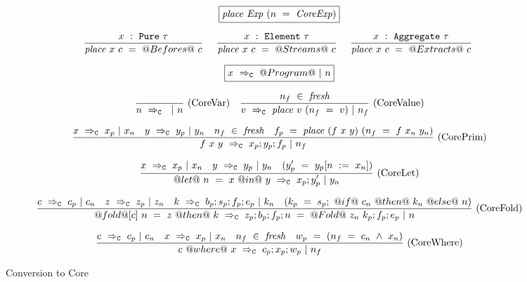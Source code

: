 
\begin{figure*}

$$
\boxed{\mathit{place}~\mathit{Exp}~(n~=~\mathit{CoreExp})}
$$

$$
\frac {\displaystyle 
    x~:~\mathtt{Pure}~\tau
} {\displaystyle 
\mathit{place}~x~c~=~@Befores@~c
} \ 
\quad
\frac {\displaystyle 
    x~:~\mathtt{Element}~\tau
} {\displaystyle 
\mathit{place}~x~c~=~@Streams@~c
} \ 
\quad
\frac {\displaystyle 
    x~:~\mathtt{Aggregate}~\tau
} {\displaystyle 
\mathit{place}~x~c~=~@Extracts@~c
} \ 
$$


$$
\boxed{x~\Rightarrow_{\mathtt{C}}~@Program@~|~n}
$$


$$
\frac {\displaystyle 
} {\displaystyle  
    n~\Rightarrow_{\mathtt{C}}~~|~n
} \ 
\textrm{(CoreVar)}
\quad
\frac {\displaystyle 
    n_f~\in~\mathit{fresh}
} {\displaystyle  
    v~\Rightarrow_{\mathtt{C}}~\mathit{place}~v~(n_f~=~v)~|~n_f
} \ 
\textrm{(CoreValue)}
$$

$$
\frac {\displaystyle 
    x~\Rightarrow_{\mathtt{C}}~x_p~|~x_n
    \quad
    y~\Rightarrow_{\mathtt{C}}~y_p~|~y_n
    \quad
    n_f~\in~\mathit{fresh}
    \quad
    f_p~=~\mathit{place}~(f~x~y)~(n_f~=~f~x_n~y_n)
} {\displaystyle  
    f~x~y~\Rightarrow_{\mathtt{C}}~x_p;y_p;f_p~|~n_f
} \ 
\textrm{(CorePrim)}
$$

$$
\frac {\displaystyle 
    x~\Rightarrow_{\mathtt{C}}~x_p~|~x_n
    \quad
    y~\Rightarrow_{\mathtt{C}}~y_p~|~y_n
    \quad
    (y_p'~=~y_p[n~:=~x_n])
} {\displaystyle  
    @let@~n~=~x~@in@~y~\Rightarrow_{\mathtt{C}}~x_p;y_p'~|~y_n
} \ 
\textrm{(CoreLet)}
$$

$$
\frac {\displaystyle 
    c~\Rightarrow_{\mathtt{C}}~c_p~|~c_n
    \quad
    z~\Rightarrow_{\mathtt{C}}~z_p~|~z_n
    \quad
    k~\Rightarrow_{\mathtt{C}}~b_p;s_p;f_p;e_p~|~k_n
    \quad
    (k_p~=~s_p;~@if@~c_n~@then@~k_n~@else@~n)
} {\displaystyle  
    @fold@[c]~n~=~z~@then@~k~\Rightarrow_{\mathtt{C}}~z_p;b_p;f_p;n~=~@Fold@~z_n~k_p;f_p;e_p~|~n
} \ 
\textrm{(CoreFold)}
$$

$$
\frac {\displaystyle 
    c~\Rightarrow_{\mathtt{C}}~c_p~|~c_n
    \quad
    x~\Rightarrow_{\mathtt{C}}~x_p~|~x_n
    \quad
    n_f~\in~\mathit{fresh}
    \quad
    w_p~=~(n_f~=~c_n~\wedge~x_n)
} {\displaystyle  
    c~@where@~x~\Rightarrow_{\mathtt{C}}~c_p;x_p;w_p~|~n_f
} \ 
\textrm{(CoreWhere)}
$$





\caption{Conversion to Core}
\label{fig:core:compile}
\end{figure*}



